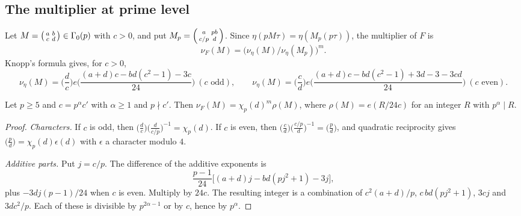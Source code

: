 \documentclass[11pt]{amsart}
\theoremstyle{definition}\newtheorem{definition}[theorem]{Definition}
\theoremstyle{remark}\newtheorem{remark}[theorem]{Remark}
\begin{document}
\subsection{The multiplier at prime level}
Let $M=\begin{psmallmatrix}a&b\\ c&d\end{psmallmatrix}\in\Gamma_0(p)$ with $c>0$, and put $M_p=\begin{psmallmatrix}a&pb\\ c/p&d\end{psmallmatrix}$. Since $\eta(pM\tau)=\eta(M_p(p\tau))$, the multiplier of $F$ is
\begin{equation}\label{eq:nuF}
\nu_F(M)=\big(\nu_\eta(M)/\nu_\eta(M_p)\big)^m .
\end{equation}
Knopp's formula \cite[Ch.~4, Thm.~2]{K} gives, for $c>0$,
\[
\nu_\eta(M)=\Big(\frac dc\Big)e\Big(\frac{(a+d)c-bd(c^2-1)-3c}{24}\Big)\ (c\text{ odd}),\qquad
\nu_\eta(M)=\Big(\frac cd\Big)e\Big(\frac{(a+d)c-bd(c^2-1)+3d-3-3cd}{24}\Big)\ (c\text{ even}).
\]

\begin{lemma}\label{lem:ppart}
Let $p\ge5$ and $c=p^\alpha c'$ with $\alpha\ge1$ and $p\nmid c'$. Then $\nu_F(M)=\chi_p(d)^m\rho(M)$, where $\rho(M)=e(R/24c)$ for an integer $R$ with $p^\alpha\mid R$.
\end{lemma}
\begin{proof}
\emph{Characters.} If $c$ is odd, then $\big(\frac dc\big)\big(\frac d{c/p}\big)^{-1}=\chi_p(d)$. If $c$ is even, then $\big(\frac cd\big)\big(\frac{c/p}d\big)^{-1}=\big(\frac pd\big)$, and quadratic reciprocity gives $\big(\frac pd\big)=\chi_p(d)\epsilon(d)$ with $\epsilon$ a character modulo $4$.

\emph{Additive parts.} Put $j=c/p$. The difference of the additive exponents is
\[
\frac{p-1}{24}\big[(a+d)j-bd(pj^2+1)-3j\big],
\]
plus $-3dj(p-1)/24$ when $c$ is even. Multiply by $24c$. The resulting integer is a combination of $c^2(a+d)/p$, $c\,bd(pj^2+1)$, $3cj$ and $3dc^2/p$. Each of these is divisible by $p^{2\alpha-1}$ or by $c$, hence by $p^\alpha$.
\end{proof}
\end{document}
